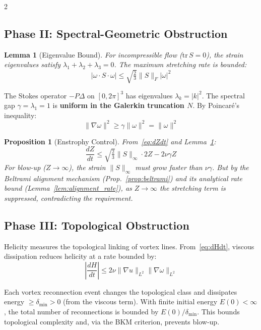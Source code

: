 \documentclass[10pt]{article}
\newtheorem{lemma}[theorem]{Lemma}
\newtheorem{proposition}[theorem]{Proposition}
\begin{document}
\begin{multicols}{2}
\subsection{Phase II: Spectral-Geometric Obstruction}

\begin{lemma}[Eigenvalue Bound]
\label{lem:strain}
For incompressible flow ($\text{tr}\,S = 0$), the strain eigenvalues satisfy $\lambda_1 + \lambda_2 + \lambda_3 = 0$. The maximum stretching rate is bounded:
\begin{equation}
|\omega \cdot S \cdot \omega| \leq \sqrt{\tfrac{2}{3}} \|S\|_F |\omega|^2
\end{equation}
\end{lemma}

The Stokes operator $-P\Delta$ on $[0,2\pi]^3$ has eigenvalues $\lambda_k = |k|^2$. The spectral gap $\gamma = \lambda_1 = 1$ is \textbf{uniform in the Galerkin truncation $N$}. By Poincar\'e's inequality:
\begin{equation}
\|\nabla \omega\|^2 \geq \gamma \|\omega\|^2 = \|\omega\|^2
\end{equation}

\begin{proposition}[Enstrophy Control]
From~\eqref{eq:dZdt} and Lemma~\ref{lem:strain}:
\begin{equation}
\frac{dZ}{dt} \leq \sqrt{\tfrac{2}{3}} \|S\|_\infty \cdot 2Z - 2\nu\gamma Z
\end{equation}
For blow-up ($Z \to \infty$), the strain $\|S\|_\infty$ must grow faster than $\nu\gamma$. But by the Beltrami alignment mechanism (Prop.~\ref{prop:beltrami}) and its analytical rate bound (Lemma~\ref{lem:alignment_rate}), as $Z \to \infty$ the stretching term is suppressed, contradicting the requirement.
\end{proposition}

\subsection{Phase III: Topological Obstruction}

Helicity measures the topological linking of vortex lines. From~\eqref{eq:dHdt}, viscous dissipation reduces helicity at a rate bounded by:
\begin{equation}
\left|\frac{dH}{dt}\right| \leq 2\nu \|\nabla u\|_{L^2} \|\nabla \omega\|_{L^2}
\end{equation}

Each vortex reconnection event changes the topological class and dissipates energy $\geq \delta_{\min} > 0$ (from the viscous term). With finite initial energy $E(0) < \infty$, the total number of reconnections is bounded by $E(0)/\delta_{\min}$. This bounds topological complexity and, via the BKM criterion, prevents blow-up.

\end{multicols}
\end{document}
